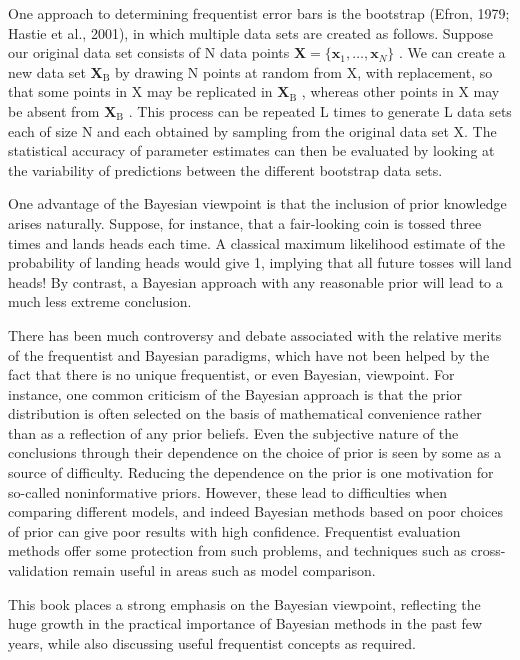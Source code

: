 \documentclass[
  10
]{article}
\begin{document}
One approach to determining frequentist error bars is the bootstrap
(Efron, 1979; Hastie et al., 2001), in which multiple data sets are
created as follows. Suppose our original data set consists of N data
points
\(\mathbf { X } = \{ \mathbf { x } _ { 1 } , \ldots , \mathbf { x } _ { N } \}\)
. We can create a new data set \(\mathbf { X } _ { \mathrm { B } }\) by
drawing N points at random from X, with replacement, so that some points
in X may be replicated in \(\mathbf { X } _ { \mathrm { B } }\) ,
whereas other points in X may be absent from
\(\mathbf { X } _ { \mathrm { B } }\) . This process can be repeated L
times to generate L data sets each of size N and each obtained by
sampling from the original data set X. The statistical accuracy of
parameter estimates can then be evaluated by looking at the variability
of predictions between the different bootstrap data sets.

One advantage of the Bayesian viewpoint is that the inclusion of prior
knowledge arises naturally. Suppose, for instance, that a fair-looking
coin is tossed three times and lands heads each time. A classical
maximum likelihood estimate of the probability of landing heads would
give 1, implying that all future tosses will land heads! By contrast, a
Bayesian approach with any reasonable prior will lead to a much less
extreme conclusion.

There has been much controversy and debate associated with the relative
merits of the frequentist and Bayesian paradigms, which have not been
helped by the fact that there is no unique frequentist, or even
Bayesian, viewpoint. For instance, one common criticism of the Bayesian
approach is that the prior distribution is often selected on the basis
of mathematical convenience rather than as a reflection of any prior
beliefs. Even the subjective nature of the conclusions through their
dependence on the choice of prior is seen by some as a source of
difficulty. Reducing the dependence on the prior is one motivation for
so-called noninformative priors. However, these lead to difficulties
when comparing different models, and indeed Bayesian methods based on
poor choices of prior can give poor results with high confidence.
Frequentist evaluation methods offer some protection from such problems,
and techniques such as cross-validation remain useful in areas such as
model comparison.

This book places a strong emphasis on the Bayesian viewpoint, reflecting
the huge growth in the practical importance of Bayesian methods in the
past few years, while also discussing useful frequentist concepts as
required.
\end{document}
